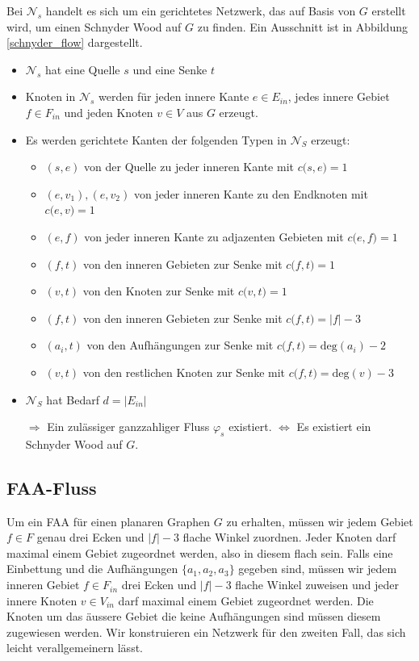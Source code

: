 \begin{network}
Bei $\mathcal{N}_s$ handelt es sich um ein gerichtetes Netzwerk, das auf Basis von $G$ erstellt wird, um einen Schnyder Wood auf $G$ zu finden. Ein Ausschnitt ist in Abbildung \ref{schnyder_flow} dargestellt.
	\begin{itemize}
	\item $\mathcal{N}_s$ hat eine Quelle $s$ und eine Senke $t$
	\item Knoten in $\mathcal{N}_s$ werden für jeden innere Kante $e \in E_{in}$, jedes innere Gebiet $f\in F_{in}$ und jeden Knoten $v \in V$ aus $G$ erzeugt.
	\item Es werden gerichtete Kanten der folgenden Typen in $\mathcal{N}_S$ erzeugt:
		\begin{itemize}
		\item $(s,e)$ von der Quelle zu jeder inneren Kante mit $c\big(s,e\big) = 1$
		\item $(e,v_1),(e,v_2)$ von jeder inneren Kante zu den Endknoten mit $c\big(e,v\big) = 1$
		\item $(e,f)$ von jeder inneren Kante zu adjazenten Gebieten mit $c\big(e,f\big) = 1$
		\item $(f,t)$ von den inneren Gebieten zur Senke mit $c\big(f,t\big) = 1$
		\item $(v,t)$ von den Knoten zur Senke mit $c\big(v,t\big) = 1$
		\item $(f,t)$ von den inneren Gebieten zur Senke mit $c\big(f,t\big) = |f|-3$
		\item $(a_i,t)$ von den Aufhängungen zur Senke mit $c\big(f,t\big) = \text{deg}(a_i)-2$
		\item $(v,t)$ von den restlichen Knoten zur Senke mit $c\big(f,t\big) = \text{deg}(v)-3$
		\end{itemize}
	\item $\mathcal{N}_S$ hat Bedarf $d=|E_{in}|$
	\item [$\Rightarrow$] Ein zulässiger ganzzahliger Fluss $\varphi_s$ existiert. $\Leftrightarrow$ Es existiert ein Schnyder Wood  auf $G$.
	\end{itemize}
\end{network}	

\subsection{FAA-Fluss}\label{faa-flow}

Um ein FAA für einen planaren Graphen $G$ zu erhalten, müssen wir jedem Gebiet $f \in F$ genau drei Ecken und $|f|-3$ flache Winkel zuordnen. Jeder Knoten darf maximal einem Gebiet zugeordnet werden, also in diesem flach sein. Falls eine Einbettung und die Aufhängungen $\{a_1,a_2,a_3\}$ gegeben sind, müssen wir jedem inneren Gebiet $f \in F_{in}$ drei Ecken und $|f|-3$ flache Winkel zuweisen und jeder innere Knoten $v \in V_{in}$ darf maximal einem Gebiet zugeordnet werden. Die Knoten um das äussere Gebiet die keine Aufhängungen sind müssen diesem zugewiesen werden. Wir konstruieren ein Netzwerk für den zweiten Fall, das sich leicht verallgemeinern lässt.\

